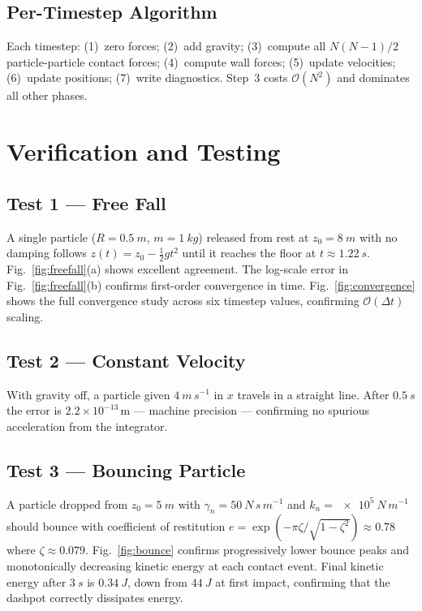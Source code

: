 \documentclass[10pt,twocolumn]{article}
\begin{document}
\subsection{Per-Timestep Algorithm}

Each timestep: (1)~zero forces; (2)~add gravity; (3)~compute all
$N(N-1)/2$ particle-particle contact forces; (4)~compute wall forces;
(5)~update velocities; (6)~update positions; (7)~write diagnostics.
Step~3 costs $\mathcal{O}(N^2)$ and dominates all other phases.

\section{Verification and Testing}

\subsection{Test 1 — Free Fall}

A single particle ($R=\SI{0.5}{m}$, $m=\SI{1}{kg}$) released from rest at
$z_0 = \SI{8}{m}$ with no damping follows $z(t) = z_0 - \tfrac{1}{2}gt^2$
until it reaches the floor at $t \approx \SI{1.22}{s}$.
Fig.~\ref{fig:freefall}(a) shows excellent agreement.
The log-scale error in Fig.~\ref{fig:freefall}(b) confirms first-order
convergence in time.
Fig.~\ref{fig:convergence} shows the full convergence study across six
timestep values, confirming $\mathcal{O}(\Delta t)$ scaling.

\subsection{Test 2 — Constant Velocity}

With gravity off, a particle given $\SI{4}{m\,s^{-1}}$ in $x$ travels in a
straight line.
After $\SI{0.5}{s}$ the error is $2.2 \times 10^{-13}$\,m --- machine
precision --- confirming no spurious acceleration from the integrator.

\subsection{Test 3 — Bouncing Particle}

A particle dropped from $z_0=\SI{5}{m}$ with
$\gamma_n=\SI{50}{N\,s\,m^{-1}}$ and $k_n=\SI{e5}{N\,m^{-1}}$ should
bounce with coefficient of restitution
$e = \exp(-\pi\zeta/\sqrt{1-\zeta^2}) \approx 0.78$
where $\zeta \approx 0.079$.
Fig.~\ref{fig:bounce} confirms progressively lower bounce peaks and
monotonically decreasing kinetic energy at each contact event.
Final kinetic energy after $\SI{3}{s}$ is $\SI{0.34}{J}$, down from
$\SI{44}{J}$ at first impact, confirming that the dashpot correctly
dissipates energy.
\end{document}
